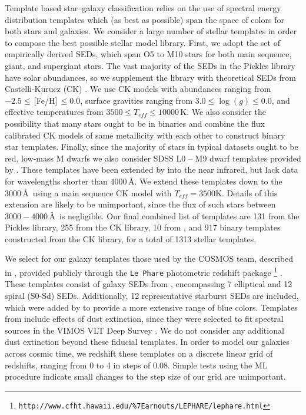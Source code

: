 \documentclass[12pt,preprint]{aastex}
\begin{document}
Template based star--galaxy classification relies on the use of spectral energy 
distribution templates which (as best as possible) span the space of colors for 
both stars and galaxies.  We consider a large number of stellar templates in 
order to compose the best possible stellar model library.  First, we adopt the 
\citet{pickles98} set of empirically derived SEDs, which span O5 to M10 stars for both 
main sequence, giant, and supergiant stars.  The vast majority of the SEDs in 
the Pickles library have solar abundances, so we supplement the library with 
theoretical SEDs from Castelli-Kurucz (CK) \citep{castelli04a}.  We use CK models with abundances 
ranging from $-2.5 \le\,$[Fe/H]$\,\le0.0$, surface gravities ranging from 
$3.0\le\log(g)\le0.0$, and effective temperatures from $3500 \le T_{eff} \le 10000\,$K.  
We also consider the possibility that many 
stars ought to be in binaries and combine the flux calibrated CK models of 
same metallicity with each other to construct binary star templates. 
 Finally, since the majority of stars in typical datasets ought to be 
red, low-mass M dwarfs we also consider SDSS L0 -- M9 dwarf templates 
provided by \citet{bochanski07}.  These templates have been extended by 
\citeauthor{bochanski07}
into the near infrared, but lack data for wavelengths shorter than 
$4000\,$\AA.  We extend these templates down to the $3000\,$\AA\, using a 
main sequence CK model with $T_{eff}=3500$K.  Details of this extension are 
likely to be unimportant, since the flux of such stars between $3000-4000\,$\AA\, 
is negligible.  Our final combined list of templates are 131 from the Pickles library, 
255 from the CK library, 10 from \citet{bochanski07}, and 917 binary templates 
constructed from the CK library, for a total of 1313 stellar templates.


We select for our galaxy templates those used by the COSMOS team, 
described in \citep{ilbert09}, provided publicly through the \texttt{Le Phare} 
photometric redshift package \footnote{\tt http://www.cfht.hawaii.edu/\%7Earnouts/LEPHARE/lephare.html} 
\citep{arnouts99,ilbert06}.  These templates consist of galaxy SEDs from 
\citet{polletta07}, encompassing 7 elliptical and 12 spiral (S0-Sd) SEDs.  
Additionally, 12 representative starburst SEDs are included, which were 
added by \citet{ilbert09} to provide a more extensive range of blue colors.  
Templates from \citet{polletta07} include effects of dust extinction, since they 
were selected to fit spectral sources in the VIMOS VLT Deep Survey 
\citep{lefevre05}.  We do not consider any additional dust extinction beyond 
these fiducial templates.  In order to model our galaxies across cosmic time, 
we redshift these templates on a discrete linear grid of redshifts, ranging from 
0 to 4 in steps of 0.08.  Simple tests using the ML procedure indicate small 
changes to the step size of our grid are unimportant.  
\end{document}
